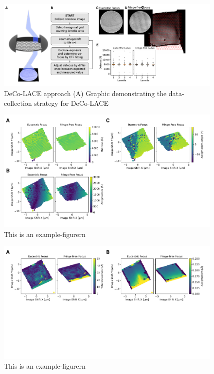 \documentclass[
]{article}
\begin{document}
\begin{figure}
\hypertarget{fig:approach}{%
\centering
\includegraphics{figures/approach.pdf}
\caption{DeCo-LACE approach (A) Graphic demonstrating the data-collection strategy for DeCo-LACE}\label{fig:approach}
}
\end{figure}

\begin{figure}
\hypertarget{fig:lamella_spatial_info}{%
\centering
\includegraphics{figures/lamella_spatial_info.pdf}
\caption{This is an example-figurern}\label{fig:lamella_spatial_info}
}
\end{figure}

\begin{figure}
\hypertarget{fig:approach3}{%
\centering
\includegraphics{figures/example-figure3.pdf}
\caption{This is an example-figurern}\label{fig:approach3}
}
\end{figure}
\end{document}

